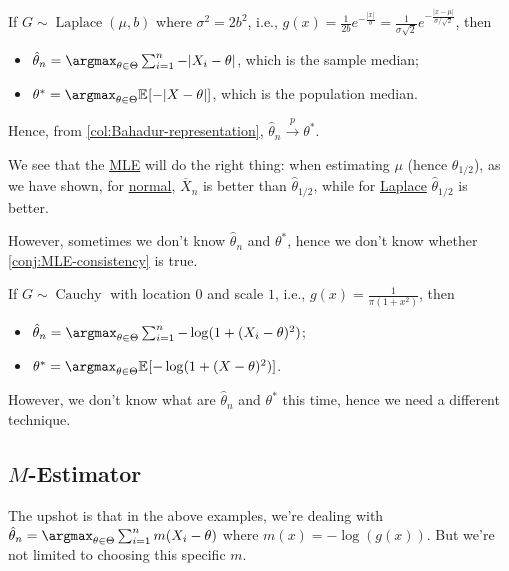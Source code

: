 \begin{eg}[Laplace]
	If \(G \sim \operatorname{Laplace} (\mu , b)\) where \(\sigma ^2 = 2b^2\), i.e., \(g(x) = \frac{1}{2b} e^{- \frac{\lvert x \rvert}{b}} = \frac{1}{\sigma \sqrt{2} } e^{- \frac{\lvert x - \mu \rvert }{\sigma / \sqrt{2} } }\), then
	\begin{itemize}
		\item \(\hat{\theta} _n = \argmax_{\theta \in \Theta } \sum_{i=1}^{n} - \lvert X_i - \theta \rvert\), which is the sample median;
		\item \(\theta ^{\ast} = \argmax_{\theta \in \Theta } \mathbb{E}_{}[- \lvert X - \theta  \rvert ] \), which is the population median.
	\end{itemize}
	Hence, from \autoref{col:Bahadur-representation}, \(\hat{\theta} _n \overset{p}{\to} \theta ^{\ast} \).
\end{eg}

\begin{remark}
	We see that the \hyperref[def:MLE]{MLE} will do the right thing: when estimating \(\mu \) (hence \(\theta _{1 / 2}\)), as we have shown, for \hyperref[eg:ARE-normal]{normal}, \(\overline{X} _n\) is better than \(\hat{\theta} _{1 / 2}\), while for \hyperref[eg:ARE-Laplace]{Laplace} \(\hat{\theta} _{1 / 2}\) is better.
\end{remark}

However, sometimes we don't know \(\hat{\theta} _n\) and \(\theta ^{\ast} \), hence we don't know whether \autoref{conj:MLE-consistency} is true.

\begin{eg}[Cauchy]
	If \(G \sim \operatorname{Cauchy} \) with location \(0\) and scale \(1\), i.e., \(g(x) = \frac{1}{\pi (1 + x^2)}\), then
	\begin{itemize}
		\item \(\hat{\theta} _n = \argmax_{\theta \in \Theta } \sum_{i=1}^{n} - \log (1 + (X_i - \theta )^2)\);
		\item \(\theta ^{\ast} = \argmax_{\theta \in \Theta } \mathbb{E}_{}[- \log (1 + (X - \theta )^2)] \).
	\end{itemize}
	However, we don't know what are \(\hat{\theta} _n\) and \(\theta ^{\ast} \) this time, hence we need a different technique.
\end{eg}

\subsection{\(M\)-Estimator}
The upshot is that in the above examples, we're dealing with \(\hat{\theta} _n = \argmax_{\theta \in \Theta } \sum_{i=1}^{n} m(X_i - \theta )\) where \(m(x) = - \log (g(x))\). But we're not limited to choosing this specific \(m\).

